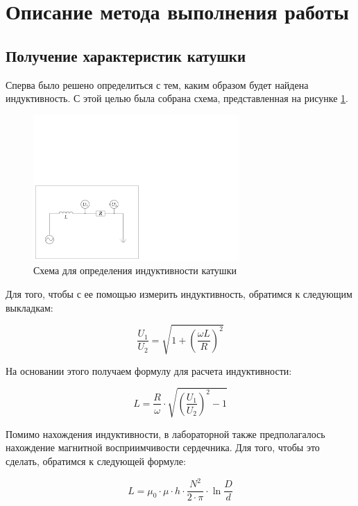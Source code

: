 \documentclass[a4paper, 12pt]{article}
\begin{document}
\section{Описание метода выполнения работы}

\subsection{Получение характеристик катушки}

Сперва было решено определиться с тем, каким образом будет найдена индуктивность. С этой целью была собрана схема, представленная на рисунке \ref{fig:circuit_L}.

\begin{figure}[H]
	\centering
	\includegraphics[width=0.7\textwidth]{Hysteresis_circuit_2}
	\caption{Схема для определения индуктивности катушки}
	\label{fig:circuit_L}
\end{figure}

Для того, чтобы с ее помощью измерить индуктивность, обратимся к следующим выкладкам:

\begin{equation*}
	\frac{U_1}{U_2} = \sqrt{1 + \left(\frac{\omega L}{R}\right)^2}
\end{equation*}

На основании этого получаем формулу для расчета индуктивности:

\begin{equation}
	\label{eq:L}
	L = \frac{R}{\omega} \cdot \sqrt{\left(\frac{U_1}{U_2}\right)^2 - 1}
\end{equation}

Помимо нахождения индуктивности, в лабораторной также предполагалось нахождение магнитной восприимчивости сердечника. Для того, чтобы это сделать, обратимся к следующей формуле:

\begin{equation*}
	L = \mu_0 \cdot \mu \cdot h \cdot \frac{N^2}{2\cdot \pi} \cdot \ln\frac{D}{d}
\end{equation*}
\end{document}
